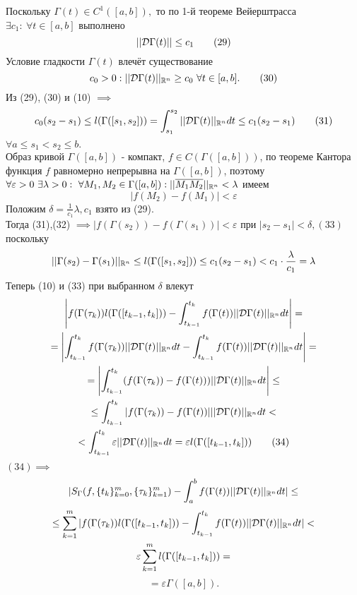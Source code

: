 \documentclass[main]{subfiles}
\begin{document}
\begin{longProof} Поскольку $\Gamma(t)\in C^1([a,b]),$ то по 1-й теореме Вейерштрасса $\exists c_1:\ \forall t\in [a,b]$ выполнено
\[ ||\mathcal{D}\Gamma(t)||\leq c_1\tag{29} \]
Условие гладкости $\Gamma(t)$ влечёт существование 
\[c_0>0: ||\mathcal{D}\Gamma(t)||_{\mathbb{R}^n}\geq c_0\ \forall t\in [a,b].\tag{30}\]
Из (29), (30) и (10) $\implies$ \[ c_0(s_2-s_1)\leq l(\Gamma([s_1,s_2]))=\int_{s_1}^{s_2} ||\mathcal{D}\Gamma(t)||_{\mathbb{R}^n} dt\leq c_1(s_2-s_1)\tag{31} \]
\( \forall a\leq s_1<s_2\leq b. \)\\
Образ кривой $\Gamma([a,b])$ - компакт, $f\in C(\Gamma([a,b]))$, по теореме Кантора функция $f$ равномерно непрерывна на $\Gamma([a,b])$, поэтому $\forall \varepsilon>0\ \exists\lambda>0:\ \forall M_1, M_2\in\Gamma([a,b]): ||\overline{M_1M_2}||_{\vR^n}<\lambda$ имеем \[ |f(M_2)-f(M_1)|<\varepsilon\tag{32} \]
Положим $\delta=\frac{1}{c_1}\lambda, c_1$ взято из (29).\\ Тогда (31),(32) $\implies |f(\Gamma(s_2))-f(\Gamma(s_1))|<\varepsilon$ при $|s_2-s_1|<\delta, (33)$ поскольку
\[ ||\Gamma(s_2)-\Gamma(s_1)||_{\mathbb{R}^n}\leq l(\Gamma([s_1,s_2]))\leq c_1(s_2-s_1)<c_1\cdot\frac{\lambda}{c_1}=\lambda \]
Теперь (10) и (33) при выбранном $\delta$ влекут
\begin{multline*} \left|f(\Gamma(\tau_k))l(\Gamma([t_{k-1},t_k]))-\int_{t_{k-1}}^{t_k} f(\Gamma(t))||\mathcal{D}\Gamma(t)||_{\mathbb{R}^n} dt\right|= \\
 =\left|\int_{t_{k-1}}^{t_k} f(\Gamma(\tau_k))||\mathcal{D}\Gamma(t)||_{\mathbb{R}^n} dt - \int_{t_{k-1}}^{t_k} f(\Gamma(t))||\mathcal{D}\Gamma(t)||_{\mathbb{R}^n} dt\right|= \\
 =\left|\int_{t_{k-1}}^{t_k} (f(\Gamma(\tau_k))-f(\Gamma(t)))||\mathcal{D}\Gamma(t)||_{\mathbb{R}^n} dt\right| \leq \\
 \leq \int_{t_{k-1}}^{t_k} |f(\Gamma(\tau_k))-f(\Gamma(t))|||\mathcal{D}\Gamma(t)||_{\mathbb{R}^n} dt< \\
 <\int_{t_{k-1}}^{t_k} \varepsilon||\mathcal{D}\Gamma(t)||_{\mathbb{R}^n} dt=\varepsilon l(\Gamma([t_{k-1},t_k]))\tag{34} \end{multline*}
$(34)\implies$ \[ |S_\Gamma(f,\{t_k\}^m_{k=0},\{\tau_k\}^m_{k=1})-\int_a^b f(\Gamma(t))||\mathcal{D}\Gamma(t)||_{\mathbb{R}^n} dt|\leq \]
\begin{multline*}
     \leq \sum\limits_{k=1}^m |f(\Gamma(\tau_k)) l(\Gamma([t_{k-1},t_k]))-\int_{t_{k-1}}^{t_k} f(\Gamma(t))||\mathcal{D}\Gamma(t)||_{\mathbb{R}^n} dt|< \\
     \varepsilon\sum\limits_{k=1}^m l(\Gamma([t_{k-1},t_k]))= 
    \end{multline*}
\[ =\varepsilon\Gamma([a,b]). \]
\end{longProof}
\end{document}

